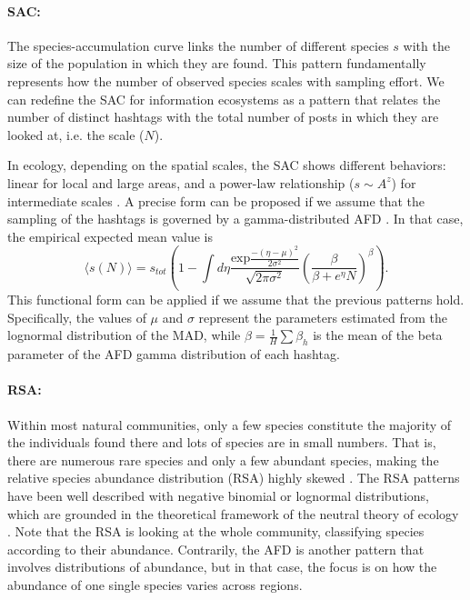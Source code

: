 \paragraph{SAC:} The species-accumulation curve links the number of different species $s$ with the size of the population in which they are found. This pattern fundamentally represents how the number of observed species scales with sampling effort. %
We can redefine the SAC for information ecosystems as a pattern that relates the number of distinct hashtags with the total number of posts in which they are looked at, i.e. the scale ($N$). 

In ecology, depending on the spatial scales, the SAC shows different behaviors: linear for local and large areas, and a power-law relationship ($s \sim A^z$) for intermediate scales \cite{azaele2016neutral}. A precise form can be proposed if we assume that the sampling of the hashtags is governed by a gamma-distributed AFD \cite{grilli2020macroecological}. In that case, the empirical expected mean value is 
\begin{equation}
    \langle s(N) \rangle =
    s_{tot} \left( 1 - \int d\eta \frac{\textrm{exp}\frac{-(\eta-\mu)^2}{2\sigma^2}}{\sqrt{2\pi \sigma^2}} 
    \left(\frac{\beta}{\beta + e^{\eta}N}\right)^{\beta} 
    \right). \label{eq:SAC}
\end{equation}
This functional form can be applied if we assume that the previous patterns hold. Specifically, the values of $\mu$ and $\sigma$ represent the parameters estimated from the lognormal distribution of the MAD, while $\beta = \frac{1}{H}\sum{\beta_h}$ is the mean of the beta parameter of the AFD gamma distribution of each hashtag.
 
\paragraph{RSA:} Within most natural communities, only a few species constitute the majority of the individuals found there and lots of species are in small numbers. That is, there are numerous rare species and only a few abundant species, making the relative species abundance distribution (RSA) highly skewed \cite{preston1948commonness,brown1995macroecology}. The RSA patterns have been well described with negative binomial or lognormal distributions, which are grounded in the theoretical framework of the neutral theory of ecology \cite{hubbell2001unified,volkov2007patterns}. Note that the RSA is looking at the whole community, classifying species according to their abundance. Contrarily, the AFD is another pattern that involves distributions of abundance, but in that case, the focus is on how the abundance of one single species varies across regions.


